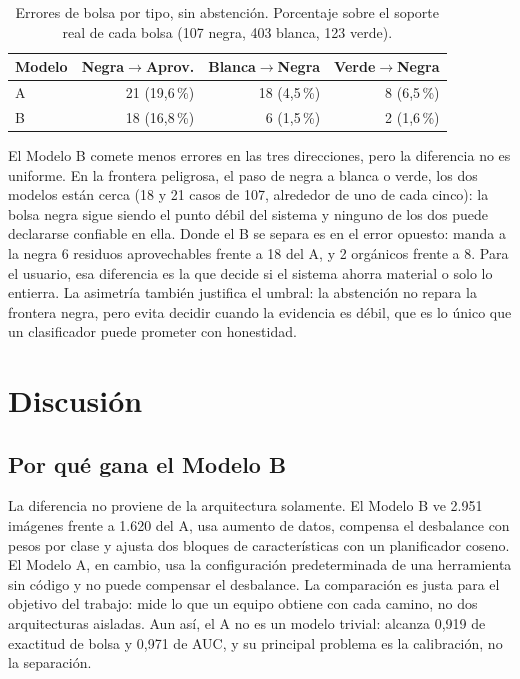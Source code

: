\documentclass[10pt]{ieeeconf}
\begin{document}
\begin{table}[t]
\centering
\caption{Errores de bolsa por tipo, sin abstenci\'on. Porcentaje sobre el
soporte real de cada bolsa (107 negra, 403 blanca, 123 verde).}
\label{tab:costo}
\footnotesize
\setlength{\tabcolsep}{4pt}
\begin{tabular}{@{}lrrr@{}}
\toprule
Modelo & Negra$\rightarrow$Aprov. & Blanca$\rightarrow$Negra & Verde$\rightarrow$Negra \\
\midrule
A & 21 (19,6\,\%) & 18 (4,5\,\%) & 8 (6,5\,\%) \\
B & 18 (16,8\,\%) & 6 (1,5\,\%) & 2 (1,6\,\%) \\
\bottomrule
\end{tabular}
\end{table}

El Modelo B comete menos errores en las tres direcciones, pero la diferencia no
es uniforme. En la frontera peligrosa, el paso de negra a blanca o verde, los dos
modelos est\'an cerca (18 y 21 casos de 107, alrededor de uno de cada cinco): la
bolsa negra sigue siendo el punto d\'ebil del sistema y ninguno de los dos puede
declararse confiable en ella. Donde el B se separa es en el error opuesto: manda
a la negra 6 residuos aprovechables frente a 18 del A, y 2 org\'anicos frente a 8.
Para el usuario, esa diferencia es la que decide si el sistema ahorra material o
solo lo entierra. La asimetr\'ia tambi\'en justifica el umbral: la abstenci\'on no
repara la frontera negra, pero evita decidir cuando la evidencia es d\'ebil, que
es lo \'unico que un clasificador puede prometer con honestidad.

\section{Discusi\'on}
\label{sec:discusion}

\subsection{Por qu\'e gana el Modelo B}

La diferencia no proviene de la arquitectura solamente. El Modelo B ve 2.951
im\'agenes frente a 1.620 del A, usa aumento de datos, compensa el desbalance con
pesos por clase y ajusta dos bloques de caracter\'isticas con un planificador
coseno. El Modelo A, en cambio, usa la configuraci\'on predeterminada de una
herramienta sin c\'odigo y no puede compensar el desbalance. La comparaci\'on es
justa para el objetivo del trabajo: mide lo que un equipo obtiene con cada
camino, no dos arquitecturas aisladas. Aun as\'i, el A no es un modelo trivial:
alcanza 0,919 de exactitud de bolsa y 0,971 de AUC, y su principal problema es la
calibraci\'on, no la separaci\'on.
\end{document}
